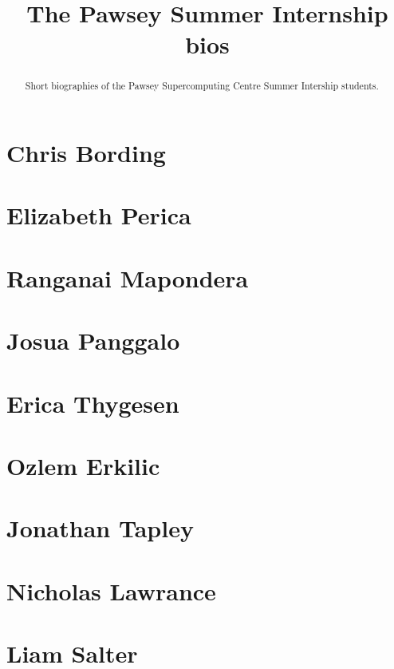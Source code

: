 \documentclass[11pt,a4paper]{report}
\title{The Pawsey Summer Internship bios}
\begin{document}
\maketitle
\tableofcontents


\begin{abstract}

Short biographies of the Pawsey Supercomputing Centre Summer Intership students.

\end{abstract}

\chapter{Chris Bording}




\chapter{Elizabeth Perica}




\chapter{Ranganai Mapondera}


\chapter{Josua Panggalo}



\chapter{Erica Thygesen}



\chapter{Ozlem Erkilic}


\chapter{Jonathan Tapley}


\chapter{Nicholas Lawrance}


\chapter{Liam Salter}

\end{document}
